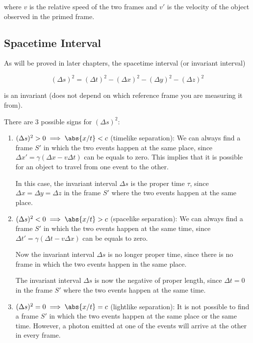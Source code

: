 \documentclass[english,a4paper,12pt]{report}
\begin{document}
where \(v\) is the relative speed of the two frames and \(v '\) is the velocity of the object observed in the primed frame.  

\subsection{Spacetime Interval}

As will be proved in later chapters, the spacetime interval (or invariant interval)

\begin{equation}
    (\Delta s) ^2 = (\Delta t)^2- (\Delta x)^2 - (\Delta y)^2 - (\Delta z)^2 
\end{equation}

is an invariant (does not depend on which reference frame you are measuring it from). 

There are 3 possible signs for \((\Delta s)^2\):

\begin{enumerate}
    \item \((\Delta s)^2 > 0 \implies \abs{x/t } < c \) (timelike separation): We can always find a frame \(S'\) in which the two events happen at the same place, since \(\Delta x' = \gamma (\Delta x - v\Delta t)\) can be equals to zero. This implies that it is possible for an object to travel from one event to the other.  
    
    In this case, the invariant interval \(\Delta s\) is the proper time \(\tau \), since \(\Delta x = \Delta y = \Delta z\) in the frame \(S'\) where the two events happen at the same place.    

    \item \((\Delta s)^2 < 0 \implies \abs{x/t} > c \) (spacelike separation): We can always find a frame \(S'\) in which the two events happen at the same time, since \(\Delta t' = \gamma (\Delta t - v\Delta x)\) can be equals to zero.
    
    Now the invariant interval \(\Delta s\) is no longer proper time, since there is no frame in which the two events happen in the same place. 
    
    The invariant interval \(\Delta s\) is now the negative of proper length, since \(\Delta t = 0\) in the frame \(S'\) where the two events happen at the same time.
    
    \item \((\Delta s)^2 = 0 \implies \abs{x/t } = c \) (lightlike separation): It is not possible to find a frame \(S'\) in which the two events happen at the same place or the same time. However, a photon emitted at one of the events will arrive at the other in every frame.       
\end{enumerate}
\end{document}
